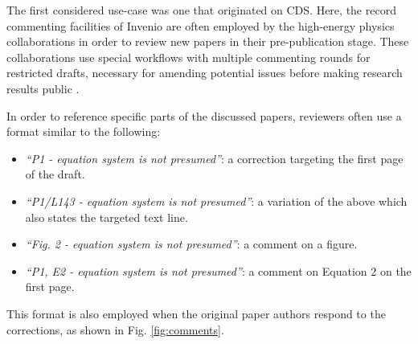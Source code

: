 
The first considered use-case was one that originated on CDS. Here, the record
commenting facilities of Invenio are often employed by the high-energy physics
collaborations in order to review new papers in their pre-publication stage.
These collaborations use special workflows with multiple commenting rounds for
restricted drafts, necessary for amending potential issues before making
research results public \cite{ref:ludmila}.

In order to reference specific parts of the discussed papers, reviewers often
use a format similar to the following:
  \begin{itemize}
      \item \textit{``P1 - equation system is not presumed''}: a correction
          targeting the first page of the draft.
      \item \textit{``P1/L143 - equation system is not presumed''}: a variation
        of the above which also states the targeted text line.
      \item \textit{``Fig. 2 - equation system is not presumed''}: a comment on
        a figure.
      \item \textit{``P1, E2 - equation system is not presumed''}: a comment on
        Equation 2 on the first page.
  \end{itemize}
This format is also employed when the original paper authors respond to the
corrections, as shown in Fig. \ref{fig:comments}.

